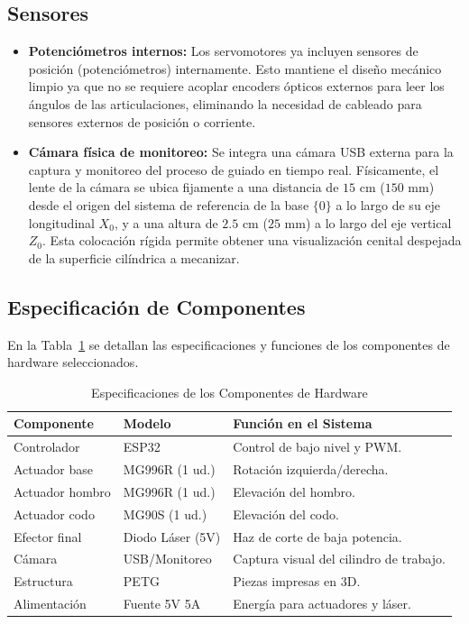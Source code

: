 \documentclass[conference,a4paper]{IEEEtran}
\begin{document}
\subsection{Sensores}
\begin{itemize}
    \item \textbf{Potenciómetros internos:} Los servomotores ya incluyen sensores de posición (potenciómetros) internamente. Esto mantiene el diseño mecánico limpio ya que no se requiere acoplar encoders ópticos externos para leer los ángulos de las articulaciones, eliminando la necesidad de cableado para sensores externos de posición o corriente.
    \item \textbf{Cámara física de monitoreo:} Se integra una cámara USB externa para la captura y monitoreo del proceso de guiado en tiempo real. Físicamente, el lente de la cámara se ubica fijamente a una distancia de $15\text{ cm}$ ($150\text{ mm}$) desde el origen del sistema de referencia de la base $\{0\}$ a lo largo de su eje longitudinal $X_0$, y a una altura de $2.5\text{ cm}$ ($25\text{ mm}$) a lo largo del eje vertical $Z_0$. Esta colocación rígida permite obtener una visualización cenital despejada de la superficie cilíndrica a mecanizar.
\end{itemize}

\subsection{Especificación de Componentes}
En la Tabla~\ref{tab:componentes} se detallan las especificaciones y funciones de los componentes de hardware seleccionados.

\begin{table}[H]
\caption{Especificaciones de los Componentes de Hardware}
\begin{center}
\footnotesize
\begin{tabular}{l l p{3.0cm}}
\toprule
\textbf{Componente} & \textbf{Modelo} & \textbf{Función en el Sistema} \\
\midrule
Controlador & ESP32 & Control de bajo nivel y PWM. \\
Actuador base & MG996R (1 ud.) & Rotación izquierda/derecha. \\
Actuador hombro & MG996R (1 ud.) & Elevación del hombro. \\
Actuador codo & MG90S (1 ud.) & Elevación del codo. \\
Efector final & Diodo Láser (5V) & Haz de corte de baja potencia. \\
Cámara & USB/Monitoreo & Captura visual del cilindro de trabajo. \\
Estructura & PETG & Piezas impresas en 3D. \\
Alimentación & Fuente 5V 5A & Energía para actuadores y láser. \\
\bottomrule
\end{tabular}
\label{tab:componentes}
\end{center}
\end{table}
\end{document}
